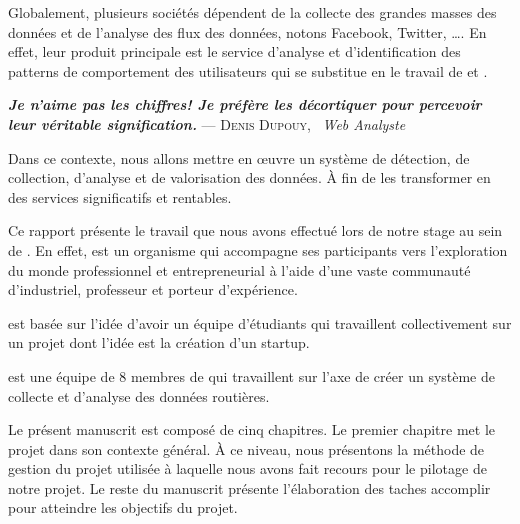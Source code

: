 Globalement, plusieurs sociétés dépendent de la collecte des grandes masses des
données et de l'analyse des flux des données, notons Facebook, Twitter, \ldots.
En effet, leur produit principale est le service d'analyse et d'identification
des patterns de comportement des utilisateurs qui se substitue en le travail de
 et .

\begin{center}
\textbf{\textit{Je n’aime pas les chiffres! Je préfère les décortiquer pour
percevoir leur véritable signification.}} \linebreak
\hfill --- \textsc{Denis Dupouy}, \ \textit{Web Analyste}
\end{center}

Dans ce contexte, nous allons mettre en \oe{}uvre un système de détection, de
collection, d'analyse et de valorisation des données. À fin de les transformer
en des services significatifs et rentables.

Ce rapport présente le travail que nous avons effectué lors de notre stage au
sein de . En effet,  est
un organisme qui accompagne ses participants vers l'exploration du monde
professionnel et entrepreneurial à l'aide d'une vaste communauté d'industriel,
professeur et porteur d'expérience.

 est basée sur l'idée d'avoir un équipe d'étudiants
qui travaillent collectivement sur un projet dont l'idée est la création d'un
startup.

 est une équipe de 8 membres  de  qui travaillent sur l'axe de créer un système de collecte et d'analyse
des données routières.

Le présent manuscrit est composé de cinq chapitres. Le premier chapitre met le
projet dans son contexte général. À ce niveau, nous présentons la méthode de
gestion du projet utilisée à laquelle nous avons fait recours pour le pilotage
de notre projet. Le reste du manuscrit présente l'élaboration des taches
accomplir pour atteindre les objectifs du projet.
